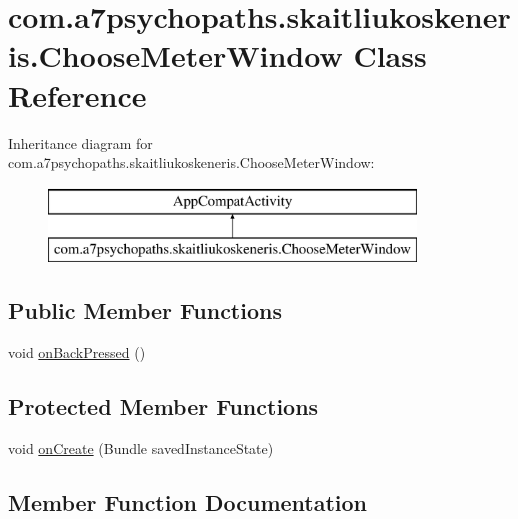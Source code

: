 \hypertarget{classcom_1_1a7psychopaths_1_1skaitliukoskeneris_1_1_choose_meter_window}{}\section{com.\+a7psychopaths.\+skaitliukoskeneris.\+Choose\+Meter\+Window Class Reference}
\label{classcom_1_1a7psychopaths_1_1skaitliukoskeneris_1_1_choose_meter_window}
Inheritance diagram for com.\+a7psychopaths.\+skaitliukoskeneris.\+Choose\+Meter\+Window\+:\begin{figure}[H]
\begin{center}
\leavevmode
\includegraphics[height=2.000000cm]{classcom_1_1a7psychopaths_1_1skaitliukoskeneris_1_1_choose_meter_window}
\end{center}
\end{figure}
\subsection*{Public Member Functions}
\begin{DoxyCompactItemize}
\item 
void \mbox{\hyperlink{classcom_1_1a7psychopaths_1_1skaitliukoskeneris_1_1_choose_meter_window_ae1fd7392911418d4434934a44104a25d}{on\+Back\+Pressed}} ()
\end{DoxyCompactItemize}
\subsection*{Protected Member Functions}
\begin{DoxyCompactItemize}
\item 
void \mbox{\hyperlink{classcom_1_1a7psychopaths_1_1skaitliukoskeneris_1_1_choose_meter_window_aaf036587257bb5ccee2c5d10dd492b33}{on\+Create}} (Bundle saved\+Instance\+State)
\end{DoxyCompactItemize}


\subsection{Member Function Documentation}
\mbox{\label{classcom_1_1a7psychopaths_1_1skaitliukoskeneris_1_1_choose_meter_window_ae1fd7392911418d4434934a44104a25d}} 
